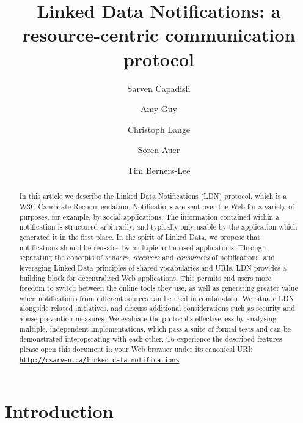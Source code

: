 \documentclass[a4paper]{llncs}
\begin{document}
\title{Linked Data Notifications: a resource-centric communication protocol}

\author{Sarven Capadisli
  \and Amy Guy
  \and Christoph Lange
  \and Sören Auer
  \and Tim Berners-Lee}
\maketitle

\begin{abstract}
  In this article we describe the Linked Data Notifications (LDN) protocol, which is a W3C Candidate Recommendation. Notifications are sent over the Web for a variety of purposes, for example, by social applications. The information contained within a notification is structured arbitrarily, and typically only usable by the application which generated it in the first place. In the spirit of Linked Data, we propose that notifications should be reusable by multiple authorised applications. Through separating the concepts of {\em senders}, {\em receivers} and {\em consumers} of notifications, and leveraging Linked Data principles of shared vocabularies and URIs, LDN provides a building block for decentralised Web applications. This permits end users more freedom to switch between the online tools they use, as well as generating greater value when notifications from different sources can be used in combination. We situate LDN alongside related initiatives, and discuss additional considerations such as security and abuse prevention measures. We evaluate the protocol’s effectiveness by analysing multiple, independent implementations, which pass a suite of formal tests and can be demonstrated interoperating with each other. To experience the described features please open this document in your Web browser under its canonical URI: {\tt \href{http://csarven.ca/linked-data-notifications}{http://csarven.ca/linked-data-notifications}}.
\end{abstract}

                        \section{Introduction}
  \label{introduction}
\end{document}
